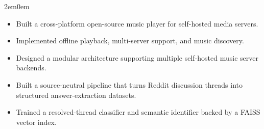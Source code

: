 \documentclass{my_cv}
\begin{document}
\begin{adjustwidth}{2em}{0em}

\begin{flushleft}
\end{flushleft}

\begin{itemize}
    \item Built a cross-platform open-source music player for self-hosted media servers.
    \item Implemented offline playback, multi-server support, and music discovery.
    \item Designed a modular architecture supporting multiple self-hosted music server backends.
\end{itemize}


\begin{flushleft}
\end{flushleft}

\begin{itemize}
    \item Built a source-neutral pipeline that turns Reddit discussion threads into structured answer-extraction datasets.
    \item Trained a resolved-thread classifier and semantic identifier backed by a FAISS vector index.
\end{itemize}

\end{adjustwidth}
\end{document}

